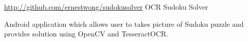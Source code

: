 

\begin{cventries}


  \cventry
    {\href{http://github.com/ernestwong/sudokusolver}{http://github.com/ernestwong/sudokusolver}} %
    { OCR Sudoku Solver} %
    {} %
    {} %
    {
      \begin{cvitems} %
      \item {Android application which allows user to takes picture of Sudoku puzzle and provides solution using OpenCV and TesseractOCR.}
      \end{cvitems}
    }



\end{cventries}

